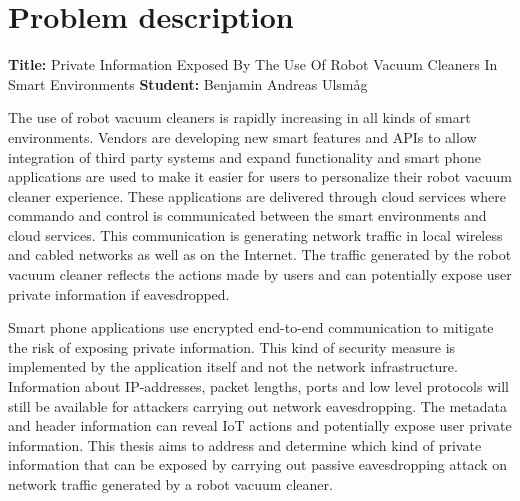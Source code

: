 \chapter*{Problem description}


\textbf{Title:} Private Information Exposed By The Use Of Robot Vacuum Cleaners In Smart Environments
\newline
\textbf{Student:} Benjamin Andreas Ulsmåg
\newline
\newline

The use of robot vacuum cleaners is rapidly increasing in all kinds of smart environments. Vendors are developing new smart features and APIs to allow integration of third party systems and expand functionality and smart phone applications are used to make it easier for users to personalize their robot vacuum cleaner experience. These applications are delivered through cloud services where commando and control is communicated between the smart environments and cloud services. This communication is generating network traffic in local wireless and cabled networks as well as on the Internet. The traffic generated by the robot vacuum cleaner reflects the actions made by users and can potentially expose user private information if eavesdropped. 

Smart phone applications use encrypted end-to-end communication to mitigate the risk of exposing private information. This kind of security measure is implemented by the application itself and not the network infrastructure. Information about IP-addresses, packet lengths, ports and low level protocols will still be available for attackers carrying out network eavesdropping. The metadata and header information can reveal IoT actions and potentially expose user private information. This thesis aims to address and determine which kind of private information that can be exposed by carrying out passive eavesdropping attack on network traffic generated by a robot vacuum cleaner. 




